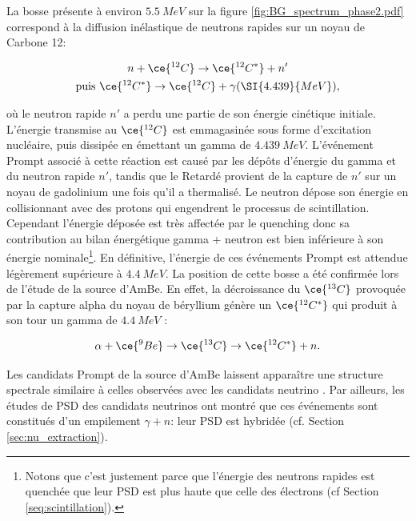 La bosse présente à environ $\SI{5.5}{MeV}$ sur la figure \ref{fig:BG_spectrum_phase2.pdf} correspond à la diffusion inélastique de neutrons rapides sur un noyau de Carbone 12:

\begin{equation}
\begin{gathered}
    n + \ce{^{12}C} \rightarrow \ce{^{12}C^*} + n'\\
    \textrm{puis } \ce{^{12}C^*} \rightarrow  \ce{^{12}C} + \gamma(\SI{4.439}{MeV}),
\end{gathered}
\end{equation}

\bigbreak

où le neutron rapide $n'$ a perdu une partie de son énergie cinétique initiale. L'énergie transmise au $\ce{^{12}C}$ est emmagasinée sous forme d'excitation nucléaire, puis dissipée en émettant un gamma de $\SI{4.439}{MeV}$. L'événement Prompt associé à cette réaction est causé par les dépôts d'énergie du gamma et du neutron rapide $n'$, tandis que le Retardé provient de la capture de $n'$ sur un noyau de gadolinium une fois qu'il a thermalisé. Le neutron dépose son énergie en collisionnant avec des protons qui engendrent le processus de scintillation. Cependant l'énergie déposée est très affectée par le quenching donc sa contribution au bilan énergétique gamma + neutron est bien inférieure à son énergie nominale\footnote{Notons que c'est justement parce que l'énergie des neutrons rapides est quenchée que leur PSD est plus haute que celle des électrons (cf Section \ref{seq:scintillation}).}. En définitive, l'énergie de ces événements Prompt est attendue légèrement supérieure à $\SI{4.4}{MeV}$. La position de cette bosse a été confirmée lors de l'étude de la source d'AmBe. En effet, la décroissance du $\ce{^{13}C}$ provoquée par la capture alpha du noyau de béryllium génère un $\ce{^{12}C^*}$ qui produit à son tour un gamma de $\SI{4.4}{MeV}$ :

\begin{equation}
    \alpha + \ce{^{9}Be} \rightarrow \ce{^{13}C} \rightarrow \ce{^{12}C^*} + n.
\end{equation}

\bigbreak

Les candidats Prompt de la source d'AmBe laissent apparaître une structure spectrale similaire à celles observées avec les candidats neutrino \cite{docdb319}. Par ailleurs, les études de PSD des candidats neutrinos ont montré que ces événements sont constitués d'un empilement $\gamma + n$: leur PSD est hybridée \cite{docdb587} (cf. Section \ref{sec:nu_extraction}).\\


